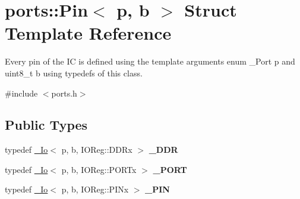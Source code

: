 \hypertarget{structports_1_1Pin}{}\section{ports\+:\+:Pin$<$ p, b $>$ Struct Template Reference}
\label{structports_1_1Pin}


Every pin of the IC is defined using the template arguments {\ttfamily enum \+\_\+\+Port p} and {\ttfamily uint8\+\_\+t b} using {\ttfamily typedef}s of this class.  




{\ttfamily \#include $<$ports.\+h$>$}

\subsection*{Public Types}
\begin{DoxyCompactItemize}
\item 
typedef \hyperlink{structports_1_1__Io}{\+\_\+\+Io}$<$ p, b, I\+O\+Reg\+::\+D\+D\+Rx $>$ {\bfseries \+\_\+\+D\+DR}\hypertarget{structports_1_1Pin_a5d991a9ebbf61a7e1e8f79a4bae99682}{}\label{structports_1_1Pin_a5d991a9ebbf61a7e1e8f79a4bae99682}

\item 
typedef \hyperlink{structports_1_1__Io}{\+\_\+\+Io}$<$ p, b, I\+O\+Reg\+::\+P\+O\+R\+Tx $>$ {\bfseries \+\_\+\+P\+O\+RT}\hypertarget{structports_1_1Pin_a4da57c84dd4c80bafaf4db38326b3400}{}\label{structports_1_1Pin_a4da57c84dd4c80bafaf4db38326b3400}

\item 
typedef \hyperlink{structports_1_1__Io}{\+\_\+\+Io}$<$ p, b, I\+O\+Reg\+::\+P\+I\+Nx $>$ {\bfseries \+\_\+\+P\+IN}\hypertarget{structports_1_1Pin_ad0fcc2d4bf1f59aed3a25bd63314aea0}{}\label{structports_1_1Pin_ad0fcc2d4bf1f59aed3a25bd63314aea0}

\end{DoxyCompactItemize}
